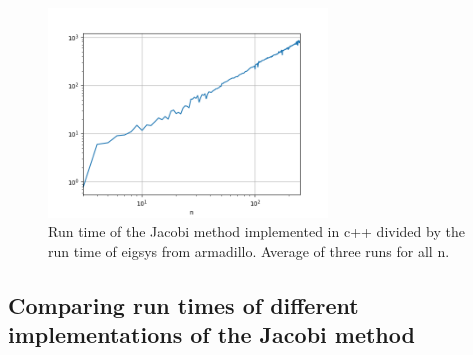 \begin{figure}[H]
  \centering
  \includegraphics[width=0.66\textwidth]{../figures/compare_arma_cpp.png}

  \caption{Run time of the Jacobi method implemented in c++ divided by the run time of eigsys
  from armadillo. Average of three runs for all n.}

  \label{fig:cpp_arma}
\end{figure}




\subsection{Comparing run times of different implementations of the Jacobi method}
